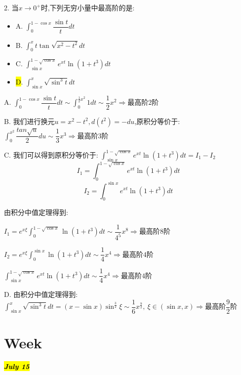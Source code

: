 2. 当$x\rightarrow 0^{+}$时,下列无穷小量中最高阶的是: 
\begin{itemize}
	\item A. $\int_{0}^{1-\cos x}\dfrac{\sin t}{t}dt$
	\item B. $\int_{0}^{x}t\tan \sqrt{x^2-t^2}dt$
	\item C. $\int_{\sin x}^{1-\sqrt{\cos x}}e^{xt}\ln(1+t^3)dt$
	\item \hl{D}. $\int_{\sin x}^{x}\sqrt{\sin^3 t}dt$
\end{itemize}
\begin{solution}
	
	A. $\int_{0}^{1-\cos x}\dfrac{\sin t}{t}dt\sim \int_{0}^{\frac{1}{2}x^2}1dt\sim \dfrac{1}{2}x^2\Rightarrow \text{最高阶} 2\text{阶}$
	
	B. 我们进行换元$u=x^2-t^2,d(t^2)=-du$,原积分等价于: $\int_{0}^{x^2}\dfrac{tan \sqrt{u}}{2}du\sim \dfrac{1}{3}x^3\Rightarrow \text{最高阶} 3\text{阶}$
	
	C. 我们可以得到原积分等价于: $\int_{\sin x}^{1-\sqrt{\cos x}}e^{xt}\ln(1+t^3)dt=I_{1}-I_{2}$
	$$I_{1}=\int_{0}^{1-\sqrt{\cos x}}e^{xt}\ln(1+t^3)dt$$
	$$I_{2}=\int_{0}^{\sin x}e^{xt}\ln(1+t^3)dt$$
	
	由积分中值定理得到: 
	
	$I_{1}=e^{x\xi}\int_{0}^{1-\sqrt{\cos x}}\ln(1+t^3)dt\sim \dfrac{1}{4^5}x^8\Rightarrow \text{最高阶} 8\text{阶}$
	
	$I_{2}=e^{x\xi}\int_{0}^{\sin x}\ln(1+t^3)dt\sim \dfrac{1}{4}x^4\Rightarrow \text{最高阶} 4\text{阶}$
	
	$\int_{\sin x}^{1-\sqrt{\cos x}}e^{xt}\ln(1+t^3)dt\sim\dfrac{1}{4}x^4\Rightarrow \text{最高阶} 4\text{阶}$
	
	D. 由积分中值定理得到: $\int_{\sin x}^{x}\sqrt{\sin^3 t}dt=(x-\sin x)\sin^{\frac{3}{2}}\xi\sim \dfrac{1}{6}x^{\frac{9}{2}},\ \xi\in(\sin x,x)\Rightarrow \text{最高阶} \dfrac{9}{2}\text{阶}$
\end{solution}

\section{Week }

\hl{\textbf{\textit{July 15}}}

